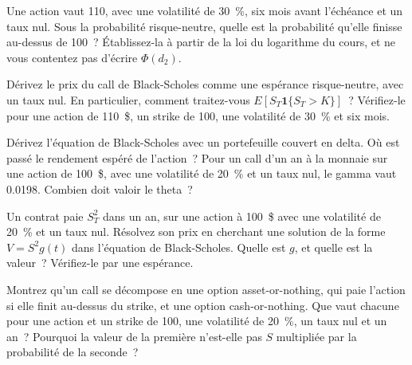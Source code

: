 \begin{question}\label{iq:iv2:pricing-and-numerics:14}
Une action vaut 110, avec une volatilité de 30~\%, six mois avant l'échéance et un taux nul. Sous la probabilité risque-neutre, quelle est la probabilité qu'elle finisse au-dessus de 100~? Établissez-la à partir de la loi du logarithme du cours, et ne vous contentez pas d'écrire $\Phi(d_2)$.
\end{question}

\begin{question}\label{iq:iv2:pricing-and-numerics:15}
Dérivez le prix du call de Black-Scholes comme une espérance risque-neutre, avec un taux nul. En particulier, comment traitez-vous $E[S_T \mathbf{1}\{S_T > K\}]$~? Vérifiez-le pour une action de 110~\$, un strike de 100, une volatilité de 30~\% et six mois.
\end{question}

\begin{question}\label{iq:iv2:pricing-and-numerics:16}
Dérivez l'équation de Black-Scholes avec un portefeuille couvert en delta. Où est passé le rendement espéré de l'action~? Pour un call d'un an à la monnaie sur une action de 100~\$, avec une volatilité de 20~\% et un taux nul, le gamma vaut 0.0198. Combien doit valoir le theta~?
\end{question}

\begin{question}\label{iq:iv2:pricing-and-numerics:17}
Un contrat paie $S_T^2$ dans un an, sur une action à 100~\$ avec une volatilité de 20~\% et un taux nul. Résolvez son prix en cherchant une solution de la forme $V = S^2 g(t)$ dans l'équation de Black-Scholes. Quelle est $g$, et quelle est la valeur~? Vérifiez-le par une espérance.
\end{question}

\begin{question}\label{iq:iv2:pricing-and-numerics:18}
Montrez qu'un call se décompose en une option asset-or-nothing, qui paie l'action si elle finit au-dessus du strike, et une option cash-or-nothing. Que vaut chacune pour une action et un strike de 100, une volatilité de 20~\%, un taux nul et un an~? Pourquoi la valeur de la première n'est-elle pas $S$ multipliée par la probabilité de la seconde~?
\end{question}

